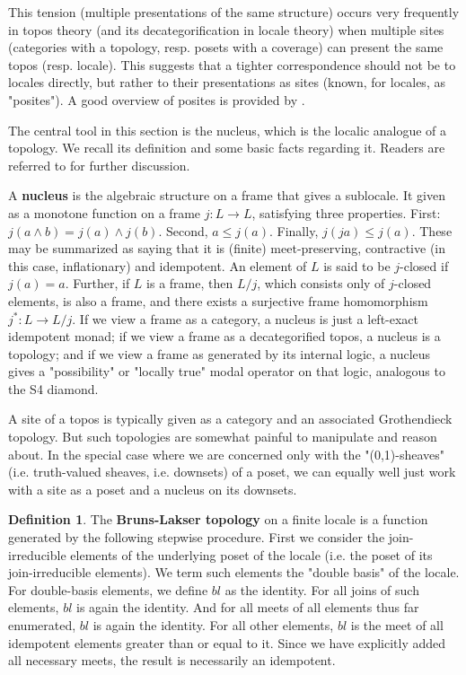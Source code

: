 \documentclass[hoptionsi,review,format=acmsmall]{acmart}
\theoremstyle{definition}
\newtheorem{definition}{Definition}[section]
\begin{document}
This tension (multiple presentations of the same structure) occurs very frequently in topos theory (and its decategorification in locale theory) when multiple sites (categories with a topology, resp. posets with a coverage) can present the same topos (resp. locale). This suggests that a tighter correspondence should not be to locales directly, but rather to their presentations as sites (known, for locales, as "posites"). A good overview of posites is provided by \cite{schultz2017temporal}.

The central tool in this section is the nucleus, which is the localic analogue of a topology. We recall its definition and some basic facts regarding it. Readers are referred to \cite{johnstone1982stone, vickers1996topology} for further discussion.

A \textbf{nucleus} is the algebraic structure on a frame that gives a sublocale. It given as a monotone function on a frame \(j : L \rightarrow L\), satisfying three properties. First: \(j(a \wedge b) = j(a) \wedge j(b)\). Second, \(a \le j(a)\). Finally, \(j(ja) \le j(a)\). These may be summarized as saying that it is (finite) meet-preserving, contractive (in this case, inflationary) and idempotent. An element of \(L\) is said to be \(j\)-closed if \(j(a)=a\). Further, if \(L\) is a frame, then \(L/j\), which consists only of \(j\)-closed elements, is also a frame, and there exists a surjective frame homomorphism \(j^* : L \rightarrow L/j\). If we view a frame as a category, a nucleus is just a left-exact idempotent monad; if we view a frame as a decategorified topos, a nucleus is a topology; and if we view a frame as generated by its internal logic, a nucleus gives a "possibility" or "locally true" modal operator on that logic, analogous to the S4 diamond.

A site of a topos is typically given as a category and an associated Grothendieck topology. But such topologies are somewhat painful to manipulate and reason about. In the special case where we are concerned only with the "(0,1)-sheaves" (i.e. truth-valued sheaves, i.e. downsets) of a poset, we can equally well just work with a site as a poset and a nucleus on its downsets.

\begin{definition}
The \textbf{Bruns-Lakser topology} on a finite locale is a function generated by the following stepwise procedure. First we consider the join-irreducible elements of the underlying poset of the locale (i.e. the poset of its join-irreducible elements). We term such elements the "double basis" of the locale. For double-basis elements, we define \(bl\) as the identity. For all joins of such elements, \(bl\) is again the identity. And for all meets of all elements thus far enumerated, \(bl\) is again the identity. For all other elements, \(bl\) is the meet of all idempotent elements greater than or equal to it. Since we have explicitly added all necessary meets, the result is necessarily an idempotent.
\end{definition}
\end{document}
